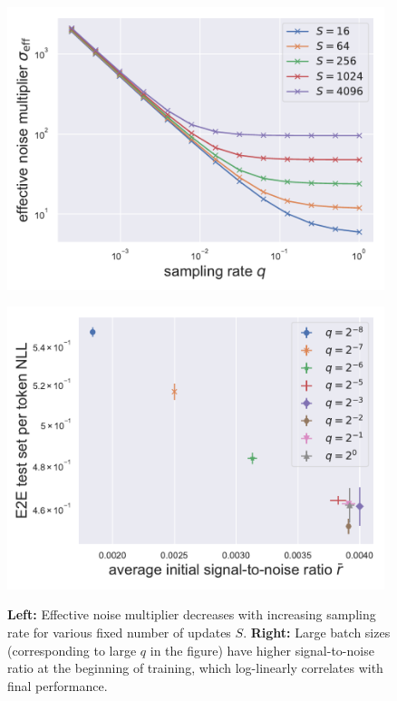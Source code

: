 \begin{figure}[htb]
\begin{center}
\begin{minipage}[t]{0.48\linewidth}
\centering
{\includegraphics[width=0.98\textwidth]{figs/fixed_t_q_vs_sigma_eff_3.pdf}}
\end{minipage}
\begin{minipage}[t]{0.48\linewidth}
\centering
{\includegraphics[width=0.98\textwidth]{figs/snr_vs_test_xent.pdf}}
\end{minipage}
\end{center}
\caption{
\textbf{Left:} Effective noise multiplier decreases with increasing sampling rate for various fixed number of updates $S$.
\textbf{Right:} Large batch sizes (corresponding to large $q$ in the figure) have higher signal-to-noise ratio at the beginning of training, which log-linearly correlates with final performance.
}
\label{fig:batch_size_fixed_t}
\end{figure}

